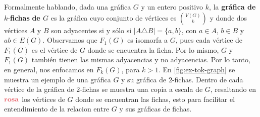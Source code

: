 Formalmente hablando, dada una gr\'afica $G$ y un entero positivo $k$, la
\textbf{gr\'afica de} $k$-\textbf{fichas} 
\textbf{de $G$} es la gr\'afica cuyo conjunto de
v\'ertices es $\binom{V(G)}{k}$ y donde dos v\'ertices $A$ y $B$ son adyacentes
si y s\'olo si $|A \triangle B| = \{a,b\}$, con $a \in A$, $b \in B$ y $ab \in
E(G)$. Observamos que $F_1(G)$ es isomorfa a $G$, pues cada v\'ertice de
$F_1(G)$ es el v\'ertice de $G$ donde se encuentra la ficha. Por lo mismo, $G$ y
$F_1(G)$ tambi\'en tienen las mismas adyacencias y no adyacencias. Por lo tanto,
en general, nos enfocamos en $F_k(G)$, para $k > 1$. En \cref{fig:ex-tok-graph}
se muestra un ejemplo de una gr\'afica $G$ y su gr\'afica de $2$-fichas. Dentro
de cada v\'ertice de la gr\'afica de $2$-fichas se muestra una copia a escala de
$G$, resaltando en ${\color{rosa}\bf rosa}$ los v\'ertices de $G$ donde se
encuentran las fichas, esto para facilitar el entendimiento de la relacion entre
$G$ y sus gr\'aficas de fichas.

